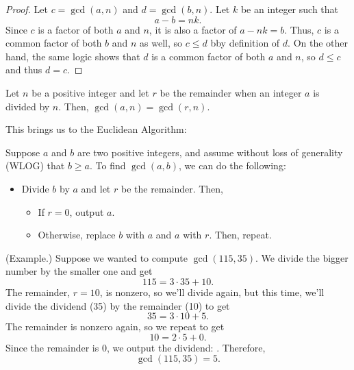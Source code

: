 \documentclass[letterpaper]{article}
\begin{document}
\begin{proof}
    Let $c = \gcd(a, n)$ and $d = \gcd(b, n)$. Let $k$ be an integer such that \[a - b = nk.\] Since $c$ is a factor of both $a$ and $n$, it is also a factor of $a - nk = b$. Thus, $c$ is a common factor of both $b$ and $n$ as well, so $c \leq d$ bby definition of $d$. On the other hand, the same logic shows that $d$ is a common factor of both $a$ and $n$, so $d \leq c$ and thus $d = c$. 
\end{proof}

\begin{corollary}{}{}
    Let $n$ be a positive integer and let $r$ be the remainder when an integer $a$ is divided by $n$. Then, $\gcd(a, n) = \gcd(r, n)$. 
\end{corollary}

This brings us to the Euclidean Algorithm: 
\begin{mdframed}
    Suppose $a$ and $b$ are two positive integers, and assume without loss of generality (WLOG) that $b \geq a$. To find $\gcd(a, b)$, we can do the following: 
    \begin{itemize}
        \item Divide $b$ by $a$ and let $r$ be the remainder. Then, 
        \begin{itemize}
            \item If $r = 0$, output $a$. 
            \item Otherwise, replace $b$ with $a$ and $a$ with $r$. Then, repeat. 
        \end{itemize}
    \end{itemize}
\end{mdframed}

\begin{mdframed}
    (Example.) Suppose we wanted to compute $\gcd(115, 35)$. We divide the bigger number by the smaller one and get 
    \[115 = 3 \cdot 35 + 10.\]
    The remainder, $r = 10$, is nonzero, so we'll divide again, but this time, we'll divide the dividend (35) by the remainder (10) to get 
    \[35 = 3 \cdot 10 + 5.\]
    The remainder is nonzero again, so we repeat to get 
    \[10 = 2 \cdot 5 + 0.\]
    Since the remainder is 0, we output the dividend: . Therefore, 
    \[\gcd(115, 35) = 5.\]
\end{mdframed}
\end{document}
